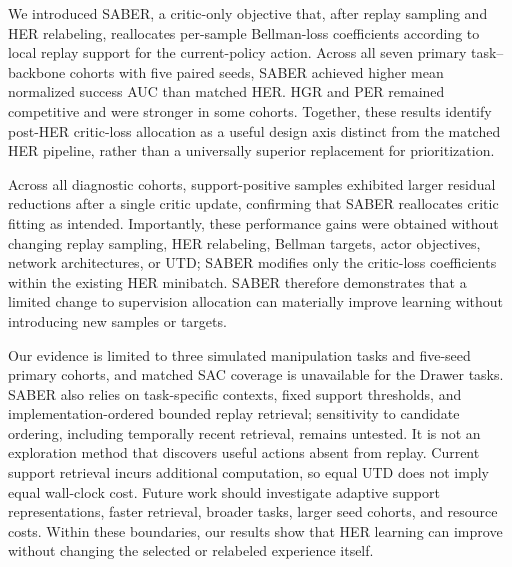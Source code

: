 \documentclass[letterpaper]{article}
\begin{document}
We introduced SABER, a critic-only objective that, after replay sampling and HER relabeling, reallocates per-sample Bellman-loss coefficients according to local replay support for the current-policy action. Across all seven primary task--backbone cohorts with five paired seeds, SABER achieved higher mean normalized success AUC than matched HER. HGR and PER remained competitive and were stronger in some cohorts. Together, these results identify post-HER critic-loss allocation as a useful design axis distinct from the matched HER pipeline, rather than a universally superior replacement for prioritization.

Across all diagnostic cohorts, support-positive samples exhibited larger residual reductions after a single critic update, confirming that SABER reallocates critic fitting as intended. Importantly, these performance gains were obtained without changing replay sampling, HER relabeling, Bellman targets, actor objectives, network architectures, or UTD; SABER modifies only the critic-loss coefficients within the existing HER minibatch. SABER therefore demonstrates that a limited change to supervision allocation can materially improve learning without introducing new samples or targets.

Our evidence is limited to three simulated manipulation tasks and five-seed primary cohorts, and matched SAC coverage is unavailable for the Drawer tasks. SABER also relies on task-specific contexts, fixed support thresholds, and implementation-ordered bounded replay retrieval; sensitivity to candidate ordering, including temporally recent retrieval, remains untested. It is not an exploration method that discovers useful actions absent from replay. Current support retrieval incurs additional computation, so equal UTD does not imply equal wall-clock cost. Future work should investigate adaptive support representations, faster retrieval, broader tasks, larger seed cohorts, and resource costs. Within these boundaries, our results show that HER learning can improve without changing the selected or relabeled experience itself.


\end{document}
